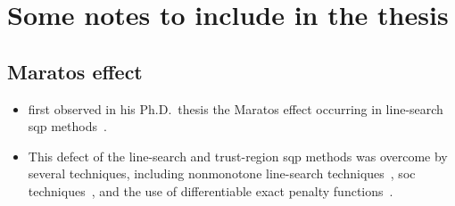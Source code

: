 %
%
%
\chapter{Some notes to include in the thesis}

\section{Maratos effect}

\begin{itemize}
    \item \citeauthor{Maratos_1978} first observed in his Ph.D.\ thesis the Maratos effect occurring in line-search \gls{sqp} methods~\cite{Maratos_1978}.
    \item This defect of the line-search and trust-region \gls{sqp} methods was overcome by several techniques, including nonmonotone line-search techniques~\cite{Chamberlain_Etal_1982}, \gls{soc} techniques~\cite{Colman_Conn_1982a,Colman_Conn_1982b,Fletcher_1982,Fukushima_1986,Mayne_1980,Mayne_Polak_1982}, and the use of differentiable exact penalty functions~\cite{Powell_Yuan_1990}.
\end{itemize}
